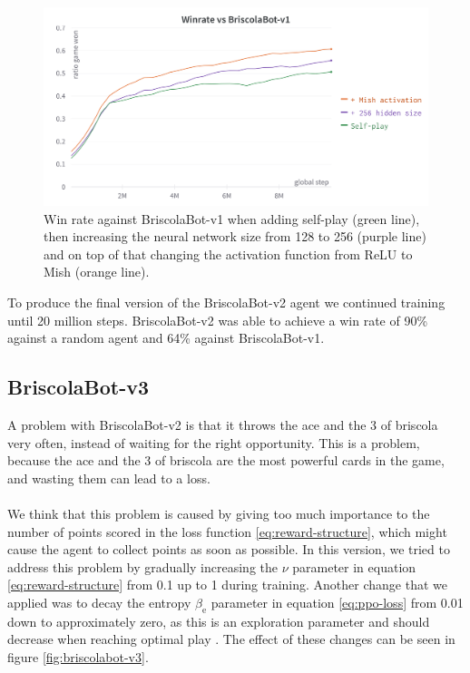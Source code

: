 \begin{figure}[H]
    \centering
    \includegraphics[width=\textwidth]{images/mish-activation.png}
    \caption{Win rate against BriscolaBot-v1 when adding self-play (green line), then increasing the neural network size from 128 to 256 (purple line) and on top of that changing the activation function from ReLU to Mish (orange line).}
    \label{fig:mish-activation}
\end{figure}

To produce the final version of the BriscolaBot-v2 agent we continued training until 20 million steps. BriscolaBot-v2 was able to achieve a win rate of 90\% against a random agent and 64\% against BriscolaBot-v1.

\subsection{BriscolaBot-v3}
A problem with BriscolaBot-v2 is that it throws the ace and the 3 of briscola very often, instead of waiting for the right opportunity. This is a problem, because the ace and the 3 of briscola are the most powerful cards in the game, and wasting them can lead to a loss.\\\\
We think that this problem is caused by giving too much importance to the number of points scored in the loss function \eqref{eq:reward-structure}, which might cause the agent to collect points as soon as possible. In this version, we tried to address this problem by gradually increasing the $\nu$ parameter in equation \eqref{eq:reward-structure} from 0.1 up to 1 during training. Another change that we applied was to decay the entropy $\beta_\textrm{e}$ parameter in equation \eqref{eq:ppo-loss} from 0.01 down to approximately zero, as this is an exploration parameter and should decrease when reaching optimal play \cite{open-ai-five}. The effect of these changes can be seen in figure \ref{fig:briscolabot-v3}.


